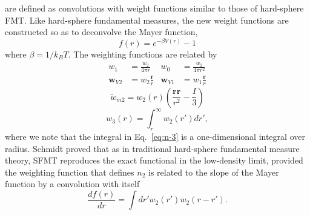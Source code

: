 \documentclass[letterpaper,twocolumn,amsmath,amssymb,prb]{revtex4-1}
\begin{document}
are defined as convolutions with weight functions similar to those of
hard-sphere FMT. Like hard-sphere fundamental measures, the new weight
functions are constructed so as to deconvolve the Mayer function,
\begin{equation}
  f(r) = e^{-\beta V(r)} - 1
  \label{eq:Mayerfunction}
\end{equation}
where $\beta = 1/k_BT$. %
The weighting functions are related by
\begin{align}
  w_1 &= \frac{w_2}{4\pi r} &
  w_0 &= \frac{w_2}{4\pi r^2}
  \label{eq:n-0-1}
  \\
  \mathbf{w}_{V2} &= w_2\frac{\textbf{r}}{r} &
  \mathbf{w}_{V1} &= w_1\frac{\textbf{r}}{r}
  \label{eq:n-vectors}
\end{align}
\begin{equation}
  \overleftrightarrow{w}_{m2} = w_2(r)\left(\frac{\mathbf{rr}}{r^2}-\frac{I}{3}\right)
  \label{eq:n-tensor}
\end{equation}
\begin{equation}
   w_3(r) = \int_{r}^{\infty} w_2(r') dr',
  \label{eq:n-3}
\end{equation}
where we note that the integral in Eq.~\ref{eq:n-3} is a
one-dimensional integral over radius. Schmidt proved that as in traditional hard-sphere fundamental measure theory, 
SFMT reproduces the exact functional in the low-density limit, provided the 
weighting function that defines $n_2$ is related to the slope of the Mayer 
function by a convolution with itself
\begin{equation}\label{eq:mayerandw2}
  \frac{d f(r)}{dr} = \int dr' w_2(r') w_2 (r-r').
\end{equation}
\end{document}
